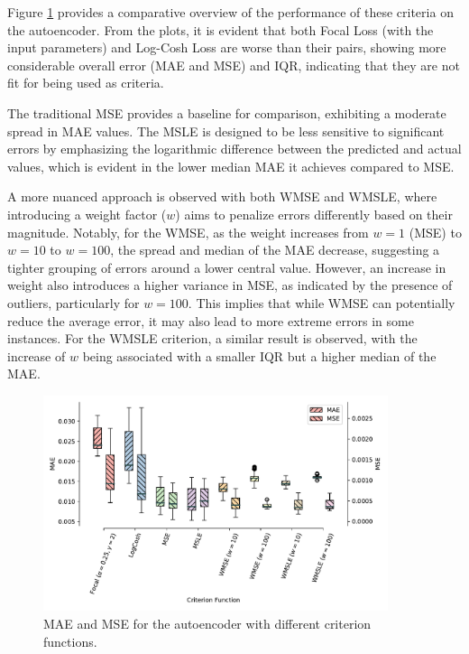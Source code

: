 Figure \ref{fig:exp04boxplot} provides a comparative overview of the performance of these criteria on the autoencoder. From the plots, it is evident that both Focal Loss (with the input parameters) and Log-Cosh Loss are worse than their pairs, showing more considerable overall error (\gls{MAE} and \gls{MSE}) and \gls{IQR}, indicating that they are not fit for being used as criteria.

 The traditional \gls{MSE} provides a baseline for comparison, exhibiting a moderate spread in \gls{MAE} values. The \gls{MSLE} is designed to be less sensitive to significant errors by emphasizing the logarithmic difference between the predicted and actual values, which is evident in the lower median \gls{MAE} it achieves compared to \gls{MSE}.

A more nuanced approach is observed with both \gls{WMSE} and \gls{WMSLE}, where introducing a weight factor ($w$) aims to penalize errors differently based on their magnitude. Notably, for the \gls{WMSE}, as the weight increases from $w=1$ (\gls{MSE}) to $w=10$ to $w=100$, the spread and median of the \gls{MAE} decrease, suggesting a tighter grouping of errors around a lower central value. However, an increase in weight also introduces a higher variance in \gls{MSE}, as indicated by the presence of outliers, particularly for $w=100$. This implies that while \gls{WMSE} can potentially reduce the average error, it may also lead to more extreme errors in some instances. For the \gls{WMSLE} criterion, a similar result is observed, with the increase of $w$ being associated with a smaller \gls{IQR} but a higher median of the \gls{MAE}.

\begin{figure}[!ht]
\noindent\hspace{0.5mm}\includegraphics[width=0.9\textwidth]{./figures/exp04/boxplot.pdf}
\caption{\gls{MAE} and \gls{MSE} for the autoencoder with different criterion functions.}
\label{fig:exp04boxplot}
\end{figure}

